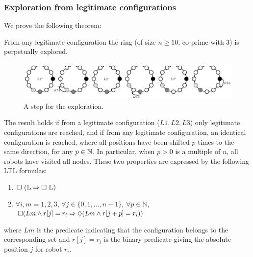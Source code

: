 \subsubsection{Exploration from legitimate configurations}

We prove the following theorem:
\begin{theorem}
\label{th:legit}
From any legitimate configuration the ring (of size $n \geq 10$, 
co-prime with $3$) is perpetually explored.
\end{theorem}

\begin{figure}[bt] 
\centering
\includegraphics[scale=1]{figures/figLegit}
\caption{A step for the exploration.} 
\label{fig:Legit} 
\end{figure} 

The result holds if from a legitimate configuration ($L1, L2, L3$) only
legitimate configurations are reached, and if from any legitimate
configuration, an identical configuration is reached, where all
positions have been shifted $p$ times to the same direction, for any
$p\in\mathbb{N}$. In particular, when $p>0$ is a multiple of $n$, all robots
have visited all nodes.
These two properties are expressed by the following \textsf{LTL} formulas:\\

\begin{enumerate}[parsep=0cm, itemsep=0cm, topsep=0cm]
\item %
\noindent \label{lem:GL}$\G \ (\mathbb{L} \Rightarrow \G \ \mathbb{L})$\\
\item %
\label{lem:explor}$\forall i, m = 1, 2, 3$, $\forall j \in
  \{0, 1, \ldots, n-1\}$, $\forall p \in \mathbb{N}$, \\
  $\Box (Lm \wedge r[j]=r_i \Rightarrow \Diamond (Lm \wedge r[j+p]=r_i))$\\
\end{enumerate}

  where $Lm$ is the predicate indicating that the configuration
  belongs to the corresponding set and $r[j]= r_i$ is the binary
  predicate giving the absolute position $j$ for robot $r_i$.


